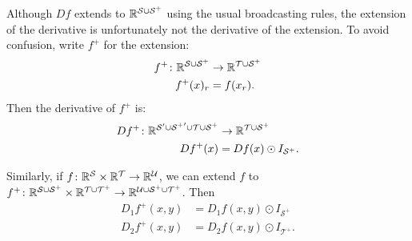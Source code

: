 Although $Df$ extends to $\mathbb{R}^{\mathcal{S} \cup \mathcal{S^+}}$ using the usual broadcasting rules, the extension of the derivative is unfortunately not the derivative of the extension. To avoid confusion, write $f^+$ for the extension:
\begin{align*}
  f^+ \colon \mathbb{R}^{\mathcal{S} \cup \mathcal{S^+}} &\rightarrow \mathbb{R}^{\mathcal{T} \cup \mathcal{S^+}} \\
  f^+(x)_r &= f(x_r).
\end{align*}
Then the derivative of $f^+$ is:
\begin{align*}
  Df^+ \colon \mathbb{R}^{\mathcal{S'} \cup \mathcal{{S^+}'} \cup \mathcal{T} \cup \mathcal{S^+}} &\rightarrow \mathbb{R}^{\mathcal{T} \cup \mathcal{S^+}} \\
  Df^+(x) &= Df(x) \odot I_{\mathcal{S}^+}.
\end{align*}  

Similarly, if $f \colon \mathbb{R}^\mathcal{S} \times \mathbb{R}^\mathcal{T} \rightarrow \mathbb{R}^\mathcal{U}$, we can extend $f$ to $f^+ \colon \mathbb{R}^\mathcal{S \cup S^+} \times \mathbb{R}^\mathcal{T \cup T^+} \rightarrow \mathbb{R}^\mathcal{U \cup S^+ \cup T^+}$. Then
\begin{align*}
  D_1 f^+(x, y) &= D_1 f(x, y) \odot I_{\mathcal{S}^+} \\
  D_2 f^+(x, y) &= D_2 f(x, y) \odot I_{\mathcal{T}^+}.
\end{align*}

